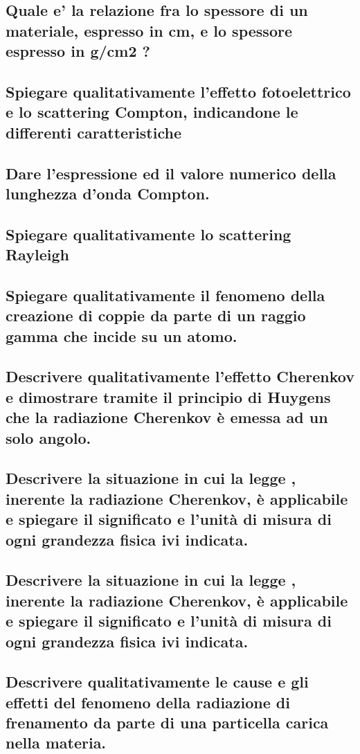 \subsection{Quale e' la relazione fra lo spessore di un materiale, espresso in cm, e lo spessore espresso in g/cm2 ?
}
\subsection{Spiegare qualitativamente l’effetto fotoelettrico e lo scattering Compton, indicandone le differenti caratteristiche
}
\subsection{Dare l'espressione ed il valore numerico della lunghezza d'onda Compton.
}
\subsection{Spiegare qualitativamente lo scattering Rayleigh
}
\subsection{Spiegare qualitativamente il fenomeno della creazione di coppie  da parte di un raggio gamma che incide su un atomo.
}
\subsection{Descrivere qualitativamente l’effetto Cherenkov e dimostrare tramite il principio di Huygens che la radiazione Cherenkov è emessa ad un solo angolo.
}
\subsection{Descrivere la situazione in cui la legge 
	, inerente la radiazione Cherenkov, è applicabile e spiegare il significato e l'unità di misura di ogni grandezza fisica ivi indicata.
}
\subsection{Descrivere la situazione in cui la legge 
	, inerente la radiazione Cherenkov, è applicabile e spiegare il significato e l'unità di misura di ogni grandezza fisica ivi indicata.
}
\subsection{Descrivere qualitativamente le cause e gli effetti del fenomeno della radiazione di frenamento da parte di una particella carica nella materia.
}
